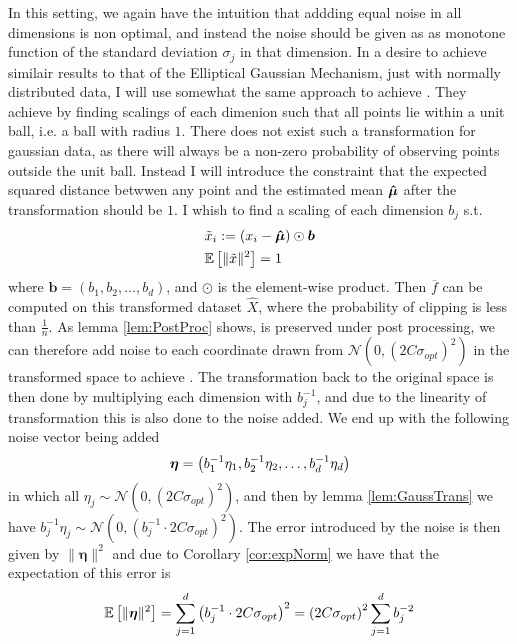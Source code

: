 \documentclass[a4paper,12pt]{article}
\begin{document}
In this setting, we again have the intuition that addding equal noise in all dimensions is non optimal, and instead the noise should be given as as monotone function
of the standard deviation $\sigma_j$ in that dimension. In a desire to achieve similair results to that of the Elliptical Gaussian Mechanism, just with normally distributed data,
I will use somewhat the same approach to achieve \edp.
They achieve \edp by finding scalings of each dimenion such that all points lie within a unit ball, i.e. a ball with radius $1$. 
There does not exist such a transformation for gaussian data, as there will always be a non-zero 
probability of observing points outside the unit ball.
Instead I will introduce the constraint that the expected squared distance betwwen any point and the estimated mean $\bm{\hat{\mu}}$ after the transformation should be $1$. 
I whish to find a scaling of each dimension $b_j$ s.t.
\begin{align}
    &\tilde{x}_i := (x_i - \bm{\hat{\mu}}) \odot \bm{b} \\
\label{eq:Alg3Con}
    &\mathbb{E} \left [ \| \tilde{x} \|^2 \right] = 1
\end{align}
where $\bm{b} = (b_1, b_2, \dots, b_d)$, and $\odot$ is the element-wise product. 
Then $\overline{f}$ can be computed on this transformed dataset $\widehat{X}$, where the probability of clipping is less than $\frac{1}{n}$.
As lemma \ref{lem:PostProc} shows, \edp is preserved under post processing, 
we can therefore add noise to each coordinate drawn from $\mathcal{N}(0,(2C\sigma_{opt})^2)$ in the transformed space to achieve \edp.
The transformation back to the original space is then done by multiplying each dimension with $b_j^{-1}$, and due to the linearity of transformation 
this is also done to the noise added.
We end up with the following noise vector being added
\[
    \bm{\eta} = \left ( b_1^{-1}\eta_1, b_2^{-1}\eta_2, \dots, b_d^{-1}\eta_d \right)
\]
in which all $\eta_j \sim \mathcal{N}(0,(2C\sigma_{opt})^2)$, and then by lemma \ref{lem:GaussTrans} we have $b_j^{-1}\eta_j \sim \mathcal{N}(0, (b_j^{-1} \cdot 2C\sigma_{opt})^2)$.
The error introduced by the noise is then given by $\| \bm{\eta} \|^2$ and due to Corollary \ref{cor:expNorm} we have that the expectation of this error is 
\begin{equation}
\label{eq:Alg3Err}
    \mathbb{E} \left [ \| \bm{\eta} \|^2 \right] = \sum_{j=1}^d \left (b_j^{-1} \cdot 2C\sigma_{opt}\right)^2   = \left (2C\sigma_{opt}\right)^2 \sum_{j=1}^d b_j^{-2}
\end{equation}
\end{document}
